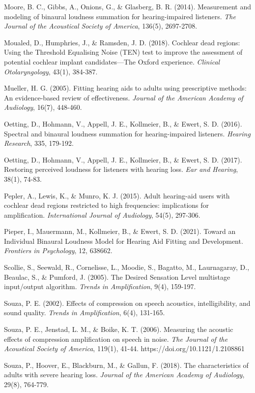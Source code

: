 \documentclass[
  12pt,
]{article}
\begin{document}
Moore, B. C., Gibbs, A., Onions, G., \& Glasberg, B. R. (2014).
Measurement and modeling of binaural loudness summation for
hearing-impaired listeners. \emph{The Journal of the Acoustical Society
of America}, 136(5), 2697-2708.

Moualed, D., Humphries, J., \& Ramsden, J. D. (2018). Cochlear dead
regions: Using the Threshold Equalising Noise (TEN) test to improve the
assessment of potential cochlear implant candidates---The Oxford
experience. \emph{Clinical Otolaryngology}, 43(1), 384-387.

Mueller, H. G. (2005). Fitting hearing aids to adults using prescriptive
methods: An evidence-based review of effectiveness. \emph{Journal of the
American Academy of Audiology}, 16(7), 448-460.

Oetting, D., Hohmann, V., Appell, J. E., Kollmeier, B., \& Ewert, S. D.
(2016). Spectral and binaural loudness summation for hearing-impaired
listeners. \emph{Hearing Research}, 335, 179-192.

Oetting, D., Hohmann, V., Appell, J. E., Kollmeier, B., \& Ewert, S. D.
(2017). Restoring perceived loudness for listeners with hearing loss.
\emph{Ear and Hearing}, 38(1), 74-83.

Pepler, A., Lewis, K., \& Munro, K. J. (2015). Adult hearing-aid users
with cochlear dead regions restricted to high frequencies: implications
for amplification. \emph{International Journal of Audiology}, 54(5),
297-306.

Pieper, I., Mauermann, M., Kollmeier, B., \& Ewert, S. D. (2021). Toward
an Individual Binaural Loudness Model for Hearing Aid Fitting and
Development. \emph{Frontiers in Psychology}, 12, 638662.

Scollie, S., Seewald, R., Cornelisse, L., Moodie, S., Bagatto, M.,
Laurnagaray, D., Beaulac, S., \& Pumford, J. (2005). The Desired
Sensation Level multistage input/output algorithm. \emph{Trends in
Amplification}, 9(4), 159-197.

Souza, P. E. (2002). Effects of compression on speech acoustics,
intelligibility, and sound quality. \emph{Trends in Amplification},
6(4), 131-165.

Souza, P. E., Jenstad, L. M., \& Boike, K. T. (2006). Measuring the
acoustic effects of compression amplification on speech in noise.
\emph{The Journal of the Acoustical Society of America}, 119(1), 41-44.
https://doi.org/10.1121/1.2108861

Souza, P., Hoover, E., Blackburn, M., \& Gallun, F. (2018). The
characteristics of adults with severe hearing loss. \emph{Journal of the
American Academy of Audiology}, 29(8), 764-779.
\end{document}
